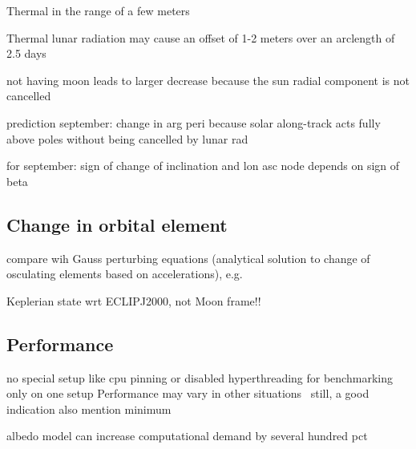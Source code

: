 Thermal in the range of a few meters ~\cite{Mazarico2011}

Thermal lunar radiation may cause an offset of 1-2 meters over an arclength of 2.5 days~\cite{Bauer2016}

not having moon leads to larger decrease because the sun radial component is not cancelled

prediction september: change in arg peri because solar along-track acts fully above poles without being cancelled by lunar rad

for september: sign of change of inclination and lon asc node depends on sign of beta


\subsection{Change in orbital element}

compare wih Gauss perturbing equations (analytical solution to change of osculating elements based on accelerations), e.g. ~\cite[Sec.~3.2]{Lucchesi2006}

Keplerian state wrt ECLIPJ2000, not Moon frame!!




\subsection{Performance}
no special setup like cpu pinning or disabled hyperthreading for benchmarking
only on one setup
Performance may vary in other situations~\cite{Mytkowicz2009}
still, a good indication
also mention minimum

albedo model can increase computational demand by several hundred pct \cite{Nicholson2010}

